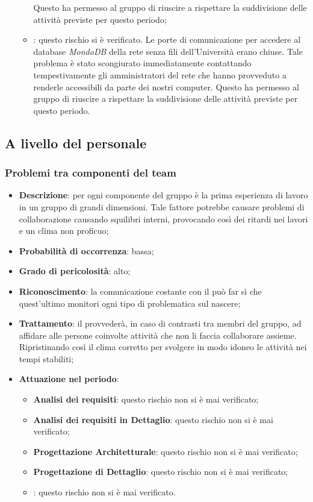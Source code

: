 \begin{itemize}
\begin{itemize}
				Questo ha permesso al gruppo di riuscire a rispettare la suddivisione delle attività previste per questo periodo;
				\item \textbf{\CO}: questo rischio si è verificato. Le porte di comunicazione per accedere al database \textit{MondoDB} della rete senza fili dell'Università erano chiuse. Tale problema è stato scongiurato immediatamente contattando tempestivamente gli amministratori del rete che hanno provveduto a renderle accessibili da parte dei nostri computer.  
				Questo ha permesso al gruppo di riuscire a rispettare la suddivisione delle attività previste per questo periodo. 
			\end{itemize}
		\end{itemize}	
	
	\subsection{A livello del personale}
	
		\subsubsection{Problemi tra componenti del team}
		\begin{itemize}
			\item \textbf{Descrizione}: per ogni componente del gruppo è la prima esperienza di lavoro in un gruppo di grandi dimensioni. Tale fattore potrebbe causare problemi di collaborazione causando squilibri interni, provocando così dei ritardi nei lavori e un clima non proficuo; 
			\item \textbf{Probabilità di occorrenza}: bassa;
			\item \textbf{Grado di pericolosità}: alto;
			\item \textbf{Riconoscimento}: la comunicazione costante con il \textit{\Res} può far sì che quest'ultimo monitori ogni tipo di problematica sul nascere;  
			\item \textbf{Trattamento}: il \textit{\Res} provvederà, in caso di contrasti tra membri del gruppo, ad affidare alle persone coinvolte attività che non li faccia collaborare assieme. Ripristinando così il clima corretto per svolgere in modo idoneo le attività nei tempi stabiliti;
			\item \textbf{Attuazione nel periodo}:
			\begin{itemize}
				\item \textbf{Analisi dei requisiti}: questo rischio non si è mai verificato;
				\item \textbf{Analisi dei requisiti in Dettaglio}: questo rischio non si è mai verificato;
				\item \textbf{Progettazione Architetturale}: questo rischio non si è mai verificato;
				\item \textbf{Progettazione di Dettaglio}: questo rischio non si è mai verificato;
				\item \textbf{\CO}: questo rischio non si è mai verificato.
			\end{itemize}
		\end{itemize}
		
